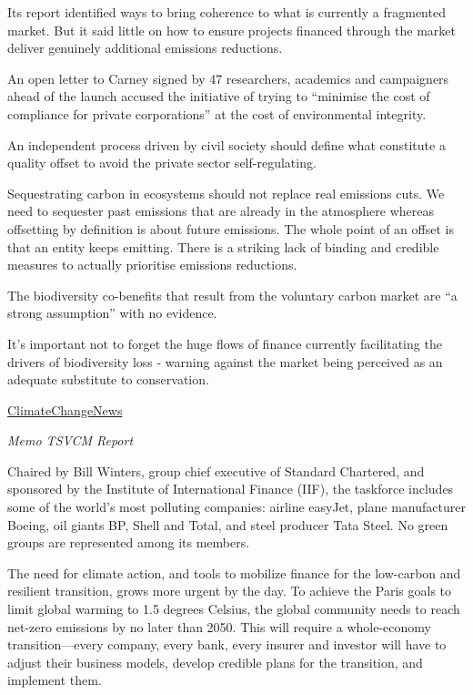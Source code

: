 \documentclass[
]{book}
\begin{document}
Its report identified ways to bring coherence to what is currently a fragmented market. But it said little on how to ensure projects financed through the market deliver genuinely additional emissions reductions.

An open letter to Carney signed by 47 researchers, academics and campaigners ahead of the launch accused the initiative of trying to ``minimise the cost of compliance for private corporations'' at the cost of environmental integrity.

An independent process driven by civil society should define what constitute a quality offset to avoid the private sector self-regulating.

Sequestrating carbon in ecosystems should not replace real emissions cuts.
We need to sequester past emissions that are already in the atmosphere whereas offsetting by definition is about future emissions. The whole point of an offset is that an entity keeps emitting. There is a striking lack of binding and credible measures to actually prioritise emissions reductions.

The biodiversity co-benefits that result from the voluntary carbon market are ``a strong assumption'' with no evidence.

It's important not to forget the huge flows of finance currently facilitating the drivers of biodiversity loss - warning against the market being perceived as an adequate substitute to conservation.

\href{https://www.climatechangenews.com/2021/01/27/carneys-carbon-offset-taskforce-ducks-environmental-integrity-questions/}{ClimateChangeNews}

\emph{Memo TSVCM Report}

Chaired by Bill Winters, group chief executive of Standard Chartered, and sponsored by the Institute of International Finance (IIF), the taskforce includes some of the world's most polluting companies: airline easyJet, plane manufacturer Boeing, oil giants BP, Shell and Total, and steel producer Tata Steel. No green groups are represented among its members.

The need for climate action, and tools to
mobilize finance for the low-carbon and
resilient transition, grows more urgent by the
day. To achieve the Paris goals to limit global
warming to 1.5 degrees Celsius, the global
community needs to reach net-zero emissions
by no later than 2050. This will require a
whole-economy transition---every company,
every bank, every insurer and investor
will have to adjust their business models,
develop credible plans for the transition, and
implement them.
\end{document}
